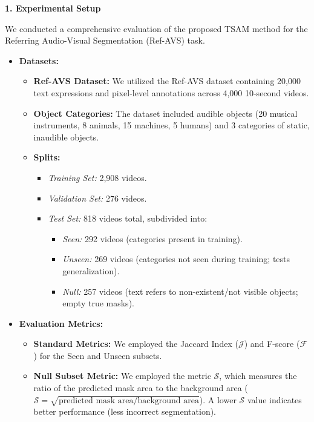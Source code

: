 \noindent\textbf{1. Experimental Setup}

We conducted a comprehensive evaluation of the proposed TSAM method for the Referring Audio-Visual Segmentation (Ref-AVS) task.

\begin{itemize}
    \item \textbf{Datasets:}
    \begin{itemize}
        \item \textbf{Ref-AVS Dataset:} We utilized the Ref-AVS dataset containing 20,000 text expressions and pixel-level annotations across 4,000 10-second videos.
        \item \textbf{Object Categories:} The dataset included audible objects (20 musical instruments, 8 animals, 15 machines, 5 humans) and 3 categories of static, inaudible objects.
        \item \textbf{Splits:}
        \begin{itemize}
            \item \textit{Training Set:} 2,908 videos.
            \item \textit{Validation Set:} 276 videos.
            \item \textit{Test Set:} 818 videos total, subdivided into:
            \begin{itemize}
                \item \textit{Seen:} 292 videos (categories present in training).
                \item \textit{Unseen:} 269 videos (categories not seen during training; tests generalization).
                \item \textit{Null:} 257 videos (text refers to non-existent/not visible objects; empty true masks).
            \end{itemize}
        \end{itemize}
    \end{itemize}
    
    \item \textbf{Evaluation Metrics:}
    \begin{itemize}
        \item \textbf{Standard Metrics:} We employed the Jaccard Index ($\mathcal{J}$) and F-score ($\mathcal{F}$) for the Seen and Unseen subsets.
        \item \textbf{Null Subset Metric:} We employed the metric $\mathcal{S}$, which measures the ratio of the predicted mask area to the background area ($\mathcal{S} = \sqrt{\text{predicted mask area} / \text{background area}}$). A lower $\mathcal{S}$ value indicates better performance (less incorrect segmentation).
    \end{itemize}
    

\end{itemize}
